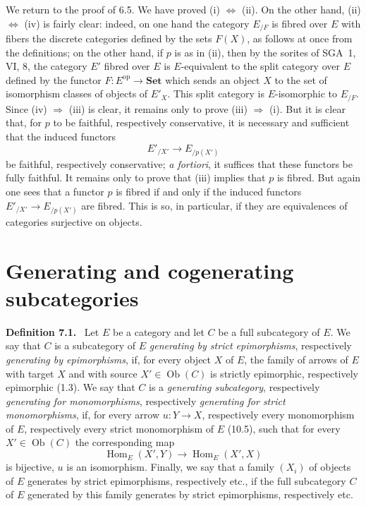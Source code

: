 \documentclass[11pt]{article}
\newcommand{\Set}{\mathbf{Set}}
\newcommand{\Ob}{\operatorname{Ob}}
\newcommand{\Hom}{\operatorname{Hom}}
\newcommand{\op}{\mathrm{op}}
\newenvironment{statement}[1]{\par\medskip\noindent\textbf{#1.}\ }{\par\medskip}
\begin{document}
We return to the proof of 6.5. We have proved (i) $\Leftrightarrow$ (ii). On the other hand, (ii) $\Leftrightarrow$ (iv) is fairly clear: indeed, on one hand the category $E_{/F}$ is fibred over $E$ with fibers the discrete categories defined by the sets $F(X)$, as follows at once from the definitions; on the other hand, if $p$ is as in (ii), then by the sorites of SGA~1, VI, 8, the category $E'$ fibred over $E$ is $E$-equivalent to the split category over $E$ defined by the functor $F:E^{\op}\to\Set$ which sends an object $X$ to the set of isomorphism classes of objects of $E'_X$. This split category is $E$-isomorphic to $E_{/F}$. Since (iv) $\Rightarrow$ (iii) is clear, it remains only to prove (iii) $\Rightarrow$ (i). But it is clear that, for $p$ to be faithful, respectively conservative, it is necessary and sufficient that the induced functors
\[
E'_{/X'}\longrightarrow E_{/p(X')}
\]
be faithful, respectively conservative; \emph{a fortiori}, it suffices that these functors be fully faithful. It remains only to prove that (iii) implies that $p$ is fibred. But again one sees that a functor $p$ is fibred if and only if the induced functors $E'_{/X'}\to E_{/p(X')}$ are fibred. This is so, in particular, if they are equivalences of categories surjective on objects.

\section{Generating and cogenerating subcategories}

\begin{statement}{Definition 7.1}
Let $E$ be a category and let $C$ be a full subcategory of $E$. We say that $C$ is a subcategory of $E$ \emph{generating by strict epimorphisms}, respectively \emph{generating by epimorphisms}, if, for every object $X$ of $E$, the family of arrows of $E$ with target $X$ and with source $X'\in\Ob(C)$ is strictly epimorphic, respectively epimorphic (1.3). We say that $C$ is a \emph{generating subcategory}, respectively \emph{generating for monomorphisms}, respectively \emph{generating for strict monomorphisms}, if, for every arrow $u:Y\to X$, respectively every monomorphism of $E$, respectively every strict monomorphism of $E$ (10.5), such that for every $X'\in\Ob(C)$ the corresponding map
\[
\Hom_E(X',Y)\longrightarrow \Hom_E(X',X)
\]
is bijective, $u$ is an isomorphism. Finally, we say that a family $(X_i)$ of objects of $E$ generates by strict epimorphisms, respectively etc., if the full subcategory $C$ of $E$ generated by this family generates by strict epimorphisms, respectively etc.
\end{statement}
\end{document}
